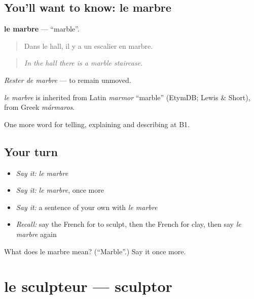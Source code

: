 \subsection*{You'll want to know: le marbre}
\textbf{le marbre} — \textquotedblleft{}marble\textquotedblright{}.

\begin{quote}
Dans le hall, il y a un escalier en marbre.
\end{quote}

\begin{quote}
\emph{In the hall there is a marble staircase.}
\end{quote}

\emph{Rester de marbre} — to remain unmoved.

\begin{cousinweb}
\emph{le marbre} is inherited from Latin \emph{marmor} \textquotedblleft{}marble\textquotedblright{} (EtymDB; Lewis \& Short), from Greek \emph{mármaros}.
\end{cousinweb}

\begin{grammarlens}[title={What you've built}]
One more word for telling, explaining and describing at B1.
\end{grammarlens}

\subsection*{Your turn}
\begin{itemize}
\raggedright
  \item \emph{Say it:} \emph{le marbre}
  \item \emph{Say it:} \emph{le marbre}, once more
  \item \emph{Say it:} a sentence of your own with \emph{le marbre}
  \item \emph{Recall:} say the French for to sculpt, then the French for clay, then say \emph{le marbre} again
\end{itemize}

\begin{tcolorbox}[breakable,colback=teal!4,colframe=teal!35!black,title={Before you move on}]
What does le marbre mean? (\textquotedblleft{}Marble\textquotedblright{}.) Say it once more.
\end{tcolorbox}
\section[le sculpteur]{le sculpteur — sculptor}

